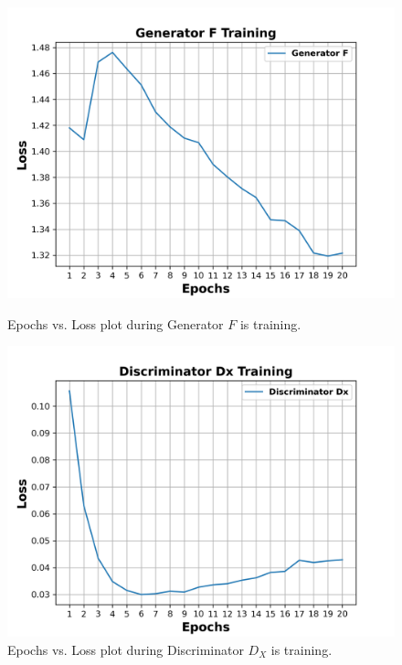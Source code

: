 \begin{figure}[H]
  \centering
  \begin{minipage}[b]{0.49\textwidth}
    \includegraphics[width=\textwidth]{images/Evaluation/GeneratorFTraining.png}
    \caption[Epochs vs. Loss plot during Generator $F$ is training.]{Epochs vs. Loss plot during Generator $F$ is training.}
    \label{fig:generatorF}
  \end{minipage}
  \hfill
  \begin{minipage}[b]{0.49\textwidth}
    \includegraphics[width=\textwidth]{images/Evaluation/DiscriminatorDxTraining.png}
    \caption[Epochs vs. Loss plot during Discriminator $D_X$ is training.]{Epochs vs. Loss plot during Discriminator $D_X$ is training.}
    \label{fig:discriminatorDx}
  \end{minipage}
\end{figure}


